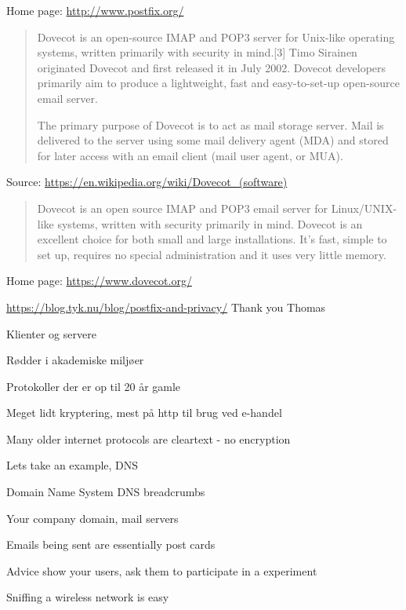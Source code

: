 \documentclass[Screen16to9,17pt]{foils}
\begin{document}
Home page: \url{http://www.postfix.org/}



\begin{quote}\footnotesize
Dovecot is an open-source IMAP and POP3 server for Unix-like operating systems, written primarily with security in mind.[3] Timo Sirainen originated Dovecot and first released it in July 2002. Dovecot developers primarily aim to produce a lightweight, fast and easy-to-set-up open-source email server.

The primary purpose of Dovecot is to act as mail storage server. Mail is delivered to the server using some mail delivery agent (MDA) and stored for later access with an email client (mail user agent, or MUA).
\end{quote}
Source: \url{https://en.wikipedia.org/wiki/Dovecot_(software)}

\begin{quote}\footnotesize
Dovecot is an open source IMAP and POP3 email server for Linux/UNIX-like systems, written with security primarily in mind. Dovecot is an excellent choice for both small and large installations. It's fast, simple to set up, requires no special administration and it uses very little memory.
\end{quote}
Home page: \url{https://www.dovecot.org/}




\url{https://blog.tyk.nu/blog/postfix-and-privacy/} Thank you Thomas




\begin{list1}
\item Klienter og servere
\item Rødder i akademiske miljøer
\item Protokoller der er op til 20 år gamle
\item Meget lidt kryptering, mest på http til brug ved e-handel
\end{list1}




\begin{list1}
\item Many older internet protocols are cleartext - no encryption
\item Lets take an example, DNS
\item Domain Name System DNS breadcrumbs
\begin{list2}
\item Your company domain, mail servers
\item Emails being sent are essentially post cards
\end{list2}
\vskip 1cm
\item Advice show your users, ask them to participate in a experiment
\item Sniffing a wireless network is easy
\end{list1}
\end{document}
